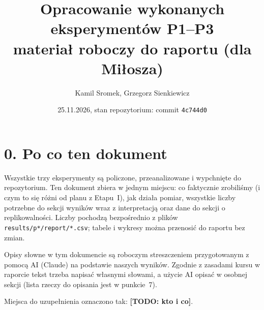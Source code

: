 \documentclass[10pt,a4paper]{article}
\title{Opracowanie wykonanych eksperymentów P1--P3\\[2pt]
\large materiał roboczy do raportu (dla Miłosza)}
\author{\small Kamil Sromek, Grzegorz Sienkiewicz}
\date{\small 25.11.2026, stan repozytorium: commit \texttt{4c744d0}}
\newcommand{\TODO}[1]{{\color{red!75!black}\textbf{[TODO: #1]}}}
\begin{document}
\maketitle
\vspace{-1em}

\section*{0. Po co ten dokument}
Wszystkie trzy eksperymenty są policzone, przeanalizowane i wypchnięte do repozytorium. Ten dokument zbiera w jednym miejscu: co faktycznie zrobiliśmy (i czym to się różni od planu z Etapu~I), jak działa pomiar, wszystkie liczby potrzebne do sekcji wyników wraz z interpretacją oraz dane do sekcji o replikowalności. Liczby pochodzą bezpośrednio z plików \texttt{results/p*/report/*.csv}; tabele i wykresy można przenosić do raportu bez zmian.

Opisy słowne w tym dokumencie są roboczym streszczeniem przygotowanym z pomocą AI (Claude) na podstawie naszych wyników. Zgodnie z zasadami kursu w raporcie tekst trzeba napisać własnymi słowami, a użycie AI opisać w osobnej sekcji (lista rzeczy do opisania jest w punkcie~7).

Miejsca do uzupełnienia oznaczono tak: \TODO{kto i co}.
\end{document}
